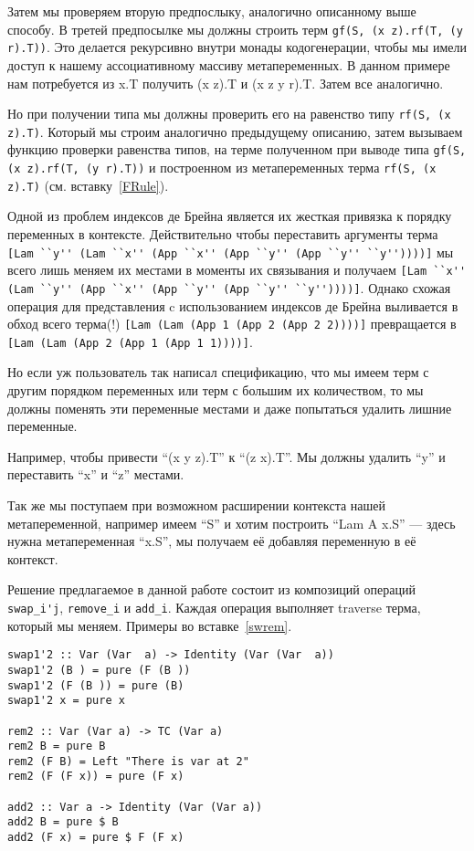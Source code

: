 Затем мы проверяем вторую предпослыку, аналогично описанному выше способу. В третей предпосылке мы должны строить терм \lstinline{gf(S, (x z).rf(T, (y r).T))}. Это делается рекурсивно внутри монады кодогенерации, чтобы мы имели доступ к нашему ассоциативному массиву метапеременных. В данном примере нам потребуется из x.T получить (x z).T и (x z y r).T. Затем все аналогично.

Но при получении типа мы должны проверить его на равенство типу  \lstinline{rf(S, (x z).T)}. Который мы строим аналогично предыдущему описанию, затем вызываем функцию проверки равенства типов, на терме полученном при выводе типа \lstinline{gf(S, (x z).rf(T, (y r).T))} и построенном из метапеременных терма \lstinline{rf(S, (x z).T)} (см. вставку~\ref{FRule}).

\hfill

Одной из проблем индексов де Брейна является их жесткая привязка к порядку переменных в контексте. Действительно чтобы переставить аргументы терма \lstinline{[Lam ``y'' (Lam ``x'' (App ``x'' (App ``y'' (App ``y'' ``y''))))]} мы всего лишь меняем их местами в моменты их связывания и получаем \lstinline{[Lam ``x'' (Lam ``y'' (App ``x'' (App ``y'' (App ``y'' ``y''))))]}. Однако схожая операция для представления c использованием индексов де Брейна выливается в обход всего терма(!) \lstinline{[Lam (Lam (App 1 (App 2 (App 2 2))))]} превращается в \lstinline{[Lam (Lam (App 2 (App 1 (App 1 1))))]}.

Но если уж пользователь так написал спецификацию, что мы имеем терм с другим порядком переменных или терм с большим их количеством, то мы должны поменять эти переменные местами и даже попытаться удалить лишние переменные.

Например, чтобы привести ``(x y z).T'' к ``(z x).T''. Мы должны удалить ``y'' и переставить ``x'' и ``z'' местами.

Так же мы поступаем при возможном расширении контекста нашей метапеременной, например имеем ``S'' и хотим построить ``Lam A x.S'' --- здесь нужна метапеременная ``x.S'', мы получаем её добавляя переменную в её контекст.

Решение предлагаемое в данной работе состоит из композиций операций \lstinline{swap_i'j}, \lstinline{remove_i} и \lstinline{add_i}. Каждая операция выполняет traverse терма, который мы меняем. Примеры во вставке~\ref{swrem}.

\begin{lstlisting}[label={swrem}, caption={Примеры функций},captionpos=b, frame=single, float, floatplacement=H]
swap1'2 :: Var (Var  a) -> Identity (Var (Var  a))
swap1'2 (B ) = pure (F (B ))
swap1'2 (F (B )) = pure (B)
swap1'2 x = pure x

rem2 :: Var (Var a) -> TC (Var a)
rem2 B = pure B
rem2 (F B) = Left "There is var at 2"
rem2 (F (F x)) = pure (F x)

add2 :: Var a -> Identity (Var (Var a))
add2 B = pure $ B
add2 (F x) = pure $ F (F x)
\end{lstlisting}

